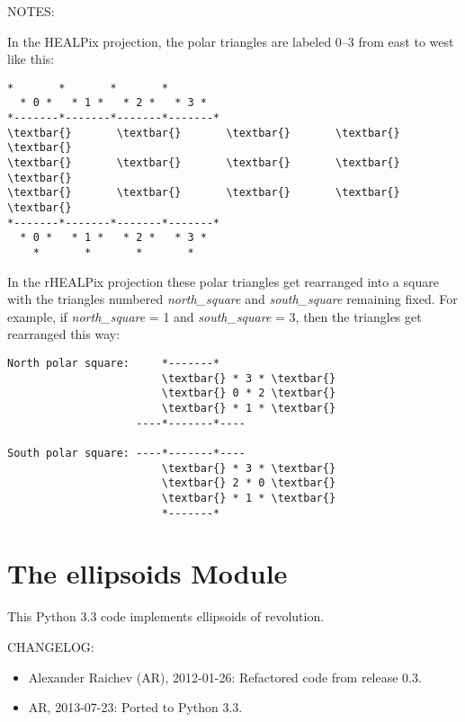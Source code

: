 \documentclass[a4paper,12ptopenany,oneside]{sphinxmanual}
\begin{document}
\begin{fulllineitems}
NOTES:

In the HEALPix projection, the polar triangles are labeled 0--3 from 
east to west like this:

\begin{Verbatim}[commandchars=\\\{\}]
    *       *       *       *       
  * 0 *   * 1 *   * 2 *   * 3 *        
*-------*-------*-------*-------*
\textbar{}       \textbar{}       \textbar{}       \textbar{}       \textbar{}
\textbar{}       \textbar{}       \textbar{}       \textbar{}       \textbar{}
\textbar{}       \textbar{}       \textbar{}       \textbar{}       \textbar{}
*-------*-------*-------*-------*
  * 0 *   * 1 *   * 2 *   * 3 *
    *       *       *       *
\end{Verbatim}

In the rHEALPix projection these polar triangles get rearranged
into a square with the triangles numbered \emph{north\_square} and \emph{south\_square} 
remaining fixed.
For example, if \emph{north\_square} = 1 and \emph{south\_square} = 3, 
then the triangles get rearranged this way:

\begin{Verbatim}[commandchars=\\\{\}]
North polar square:     *-------*       
                        \textbar{} * 3 * \textbar{}    
                        \textbar{} 0 * 2 \textbar{}    
                        \textbar{} * 1 * \textbar{}    
                    ----*-------*----
                    
South polar square: ----*-------*----
                        \textbar{} * 3 * \textbar{}
                        \textbar{} 2 * 0 \textbar{}
                        \textbar{} * 1 * \textbar{}
                        *-------*
\end{Verbatim}

\end{fulllineitems}



\chapter{The ellipsoids Module}
\label{ellipsoids:the-ellipsoids-module}\label{ellipsoids::doc}\label{ellipsoids:module-ellipsoids}
This Python 3.3 code implements ellipsoids of revolution.

CHANGELOG:
\begin{itemize}
\item {} 
Alexander Raichev (AR), 2012-01-26: Refactored code from release 0.3.

\item {} 
AR, 2013-07-23: Ported to Python 3.3.

\end{itemize}
\end{document}
